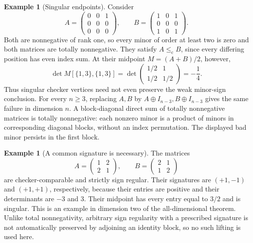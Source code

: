 \documentclass[10pt,a4paper]{article}
\theoremstyle{definition}
\newtheorem{example}[theorem]{Example}
\theoremstyle{remark}
\numberwithin{equation}{section}
\newcommand{\chle}{\leq_{\mathrm c}}
\begin{document}
\begin{example}[Singular endpoints]\label{ex:singular}
Consider
\[
 A=\begin{pmatrix}0&0&1\\0&0&0\\0&0&0\end{pmatrix},
 \qquad
 B=\begin{pmatrix}1&0&1\\0&0&0\\1&0&1\end{pmatrix}.
\]
Both are nonnegative of rank one, so every minor of order at
least two is zero and both matrices are totally nonnegative.
They satisfy $A\chle B$, since every differing position has
even index sum. At their midpoint $M=(A+B)/2$, however,
\[
 \det M[\{1,3\},\{1,3\}]
 =\det\begin{pmatrix}1/2&1\\1/2&1/2\end{pmatrix}
 =-\frac14.
\]
Thus singular checker vertices need not even preserve the weak
minor-sign conclusion. For every $n\geq3$, replacing $A,B$ by
$A\oplus I_{n-3},B\oplus I_{n-3}$ gives the same failure in
dimension $n$. A block-diagonal direct sum of totally nonnegative
matrices is totally nonnegative: each nonzero minor is a product
of minors in corresponding diagonal blocks, without an index
permutation. The displayed bad minor persists in the first block.
\end{example}

\begin{example}[A common signature is necessary]\label{ex:signature}
The matrices
\[
 A=\begin{pmatrix}1&2\\2&1\end{pmatrix},\qquad
 B=\begin{pmatrix}2&1\\1&2\end{pmatrix}
\]
are checker-comparable and strictly sign regular. Their signatures
are $(+1,-1)$ and $(+1,+1)$, respectively, because their entries
are positive and their determinants are $-3$ and $3$.
Their midpoint has every entry equal to $3/2$ and is singular.
This is an example in dimension two of the all-dimensional
theorem. Unlike total nonnegativity, arbitrary sign regularity
with a prescribed signature is not automatically preserved by
adjoining an identity block, so no such lifting is used here.
\end{example}
\end{document}
